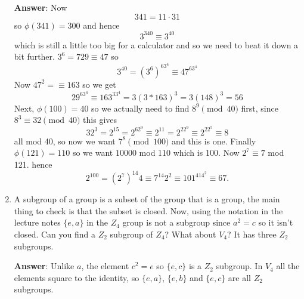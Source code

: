 \documentclass[12pt]{article}
\begin{document}
\begin{enumerate}
\textbf{Answer}: 
Now
\begin{equation}
341=11\cdot 31
\end{equation}
so $\phi(341)=300$ and hence
\begin{equation}
3^{340}\equiv 3^{40}
\end{equation}
which is still a little too big for a calculator and so we need to
beat it down a bit further. $3^6=729\equiv 47$ so
\begin{equation}
3^{40}=(3^6)^63^4\equiv 47^63^4
\end{equation}
Now $47^2=\equiv 163$ so we get
\begin{equation}
29^63^4\equiv 163^33^4 = 3(3*163)^3=3(148)^3=56
\end{equation}
Next, $\phi(100)=40$ so we actually need to find $8^9\pmod{40}$ first, since $8^3\equiv 32\pmod{40}$ this gives 
\begin{equation}
32^3=2^{15}= 2^62^9\equiv 2^{11}=2^22^9\equiv 2^22^5\equiv 8
\end{equation}
all mod 40, so now we want $7^8\pmod{100}$ and this is one. Finally $\phi(121)=110$ so we want $10000$ mod 110 which is 100. Now $2^7\equiv 7$ mod 121. hence
\begin{equation}
2^{100}=(2^7)^{14}4\equiv 7^{14}2^2\equiv 101^414^2\equiv 67.
\end{equation}

\item A subgroup of a group is a subset of the group that is a group,
  the main thing to check is that the subset is closed. Now, using the
  notation in the lecture notes $\{e,a\}$ in the $Z_4$ group is not a
  subgroup since $a^2=c$ so it isn't closed. Can you find a $Z_2$
  subgroup of $Z_4$? What about $V_4$? It has three $Z_2$ subgroups.

\textbf{Answer}:
Unlike $a$, the element $c^2=e$ so $\{e,c\}$ is a $Z_2$ subgroup. In $V_4$ all the elements square to the identity, so $\{e,a\}$, $\{e,b\}$ and $\{e,c\}$ are all $Z_2$ subgroups.

\end{enumerate}
\end{document}
